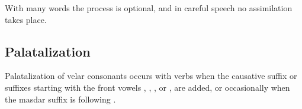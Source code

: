 With many words the process is optional, and in careful speech no assimilation takes place.



\subsection{Palatalization}
\label{ssec:Palatalization}

Palatalization of velar consonants occurs with verbs when the causative suffix  or suffixes starting with the front vowels  , , ,  or  ,  are added, or occasionally when the masdar suffix  is following .
%
